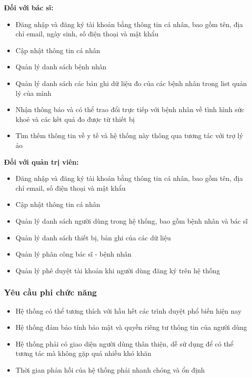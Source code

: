 \textbf{Đối với bác sĩ:}
\begin{adjustwidth}{1.5em}{}
\begin{itemize}
    \item Đăng nhập và đăng ký tài khoản bằng thông tin cá nhân, bao gồm tên, địa chỉ email, ngày sinh, số điện thoại và mật khẩu
    \item Cập nhật thông tin cá nhân
    \item Quản lý danh sách bệnh nhân
    \item Quản lý danh sách các bản ghi dữ liệu đo của các bệnh nhân trong list quản lý của mình
    \item Nhận thông báo và có thể trao đổi trực tiếp với bệnh nhân về tình hình sức khoẻ và các kết quả đo được từ thiết bị
    \item Tìm thêm thông tin về y tế và hệ thống này thông qua tương tác với trợ lý ảo 
\end{itemize}
\end{adjustwidth}
\textbf{Đối với quản trị viên:}
\begin{adjustwidth}{1.5em}{}
\begin{itemize}
    \item Đăng nhập và đăng ký tài khoản bằng thông tin cá nhân, bao gồm tên, địa chỉ email, số điện thoại và mật khẩu
    \item Cập nhật thông tin cá nhân
    \item Quản lý danh sách người dùng trong hệ thống, bao gồm bệnh nhân và bác sĩ
    \item Quản lý danh sách thiết bị, bản ghi của các dữ liệu
    \item Quản lý phân công bác sĩ - bệnh nhân
    \item Quản lý phê duyệt tài khoản khi người dùng đăng ký trên hệ thống
\end{itemize}
\end{adjustwidth}

\subsubsection{Yêu cầu phi chức năng}
\begin{itemize}
    \item Hệ thống có thể tương thích với hầu hết các trình duyệt phổ biến hiện nay
    \item Hệ thống đảm bảo tính bảo mật và quyền riêng tư thông tin của người dùng
    \item Hệ thống phải có giao diện người dùng thân thiện, dễ sử dụng để có thể tương tác mà không gặp quá nhiều khó khăn
    \item Thời gian phản hồi của hệ thống phải nhanh chóng và ổn định
\end{itemize}


